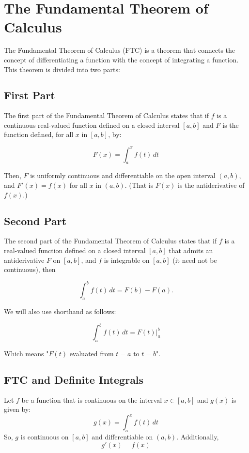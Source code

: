 \chapter{The Fundamental Theorem of Calculus}

The Fundamental Theorem of Calculus (FTC) is a theorem that connects the
concept of differentiating a function with the concept of integrating
a function. This theorem is divided into two parts:

\section{First Part}

The first part of the Fundamental Theorem of Calculus states that if
$f$ is a continuous real-valued function defined on a closed interval
$[a, b]$ and $F$ is the function defined, for all $x$ in $[a, b]$, by:

\begin{equation}
F(x) = \int_a^x f(t) \, dt
\end{equation}

Then, $F$ is uniformly continuous and differentiable on the open
interval $(a, b)$, and $F'(x) = f(x)$ for all $x$ in $(a, b)$.
(That is $F(x)$ is the antiderivative of $f(x)$.)

\section{Second Part}

The second part of the Fundamental Theorem of Calculus states that if
$f$ is a real-valued function defined on a closed interval $[a, b]$
that admits an antiderivative $F$ on $[a, b]$, and $f$ is integrable
on $[a, b]$ (it need not be continuous), then

\begin{equation}
\int_a^b f(t) \, dt = F(b) - F(a).
\end{equation}

We will also use shorthand as follows:

\begin{equation}
\int_a^b f(t)\,dt = F(t)|_a^b
\end{equation}

Which means "$F(t)$ evaluated from $t=a$ to $t=b$". 

\section{FTC and Definite Integrals}
Let $f$ be a function that is continuous on the interval $x \in \left[ a, b \right]$ and $g(x)$ is given by:
$$g(x) = \int_a^x f(t)\,dt$$
So, $g$ is continuous on $\left[a, b \right]$ and differentiable on $\left( a, b \right)$. Additionally, 
$$g'(x) = f(x)$$

